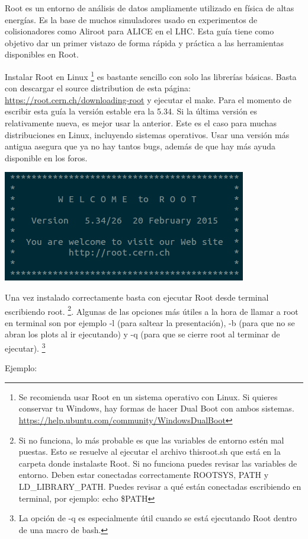 \documentclass{article}
\begin{document}
Root es un entorno de an\'alisis de datos ampliamente utilizado en f\'isica de altas energ\'ias. Es la base de muchos simuladores usado en experimentos de colisionadores como Aliroot para ALICE en el LHC. Esta gu\'ia tiene como objetivo dar un primer vistazo de forma r\'apida y pr\'actica a las herramientas disponibles en Root. \par
Instalar Root en Linux \footnote{Se recomienda usar Root en un sistema operativo con Linux. Si quieres conservar tu Windows, hay formas de hacer Dual Boot con ambos sistemas. \url{https://help.ubuntu.com/community/WindowsDualBoot}} es bastante sencillo con solo las librer\'ias b\'asicas. Basta con descargar el source distribution de esta p\'agina: \url{https://root.cern.ch/downloading-root} y ejecutar el make. Para el momento de escribir esta gu\'ia la versi\'on estable era la 5.34. Si la \'ultima versi\'on es relativamente nueva, es mejor usar la anterior. Este es el caso para muchas distribuciones en Linux, incluyendo sistemas operativos. Usar una versi\'on m\'as antigua asegura que ya no hay tantos bugs, adem\'as de que hay m\'as ayuda disponible en los foros.
\begin{center}
\includegraphics[scale=0.65]{welcome.png}
\end{center}
Una vez instalado correctamente basta con ejecutar Root desde terminal escribiendo root. \footnote{Si no funciona, lo m\'as probable es que las variables de entorno est\'en mal puestas. Esto se resuelve al ejecutar el archivo thisroot.sh que est\'a en la carpeta donde instalaste Root. Si no funciona puedes revisar las variables de entorno. Deben estar conectadas correctamente ROOTSYS, PATH y LD\_LIBRARY\_PATH. Puedes revisar a qu\'e est\'an conectadas escribiendo en terminal, por ejemplo: echo \$PATH}. 
Algunas de las opciones m\'as \'utiles a la hora de llamar a root en terminal son por ejemplo -l (para saltear la presentaci\'on), -b (para que no se abran los plots al ir ejecutando) y -q (para que se cierre root al terminar de ejecutar). \footnote{La opci\'on de -q es especialmente \'util cuando se est\'a ejecutando Root dentro de una macro de bash.} \par
Ejemplo:
\end{document}
